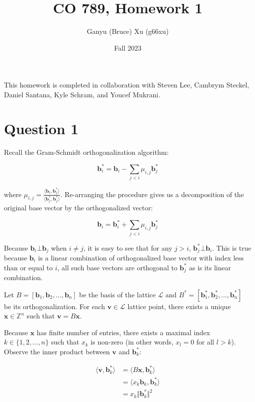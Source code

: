 \documentclass{article}
\title{CO 789, Homework 1}
\author{Ganyu (Bruce) Xu (g66xu)}
\date{Fall 2023}
\newcommand{\norm}[1]{\Vert {#1} \Vert}
\begin{document}

This homework is completed in collaboration with Steven Lee, Cambrym Steckel, Daniel Santana, Kyle Schram, and Youcef Mukrani.

\section*{Question 1}
Recall the Gram-Schmidt orthogonalization algorithm:

$$
\mathbf{b}_i^\ast = \mathbf{b}_i - \sum_{j<i} \mu_{i,j} \mathbf{b}_j^\ast
$$

where $\mu_{i, j} = \frac{\langle \mathbf{b}_i, \mathbf{b}_j^\ast \rangle}{\langle \mathbf{b}_j^\ast, \mathbf{b}_j^\ast\rangle}$. Re-arranging the procedure gives us a decomposition of the original base vector by the orthogonalized vector:

$$
\mathbf{b}_i = \mathbf{b}_i^\ast + \sum_{j<i}\mu_{i,j}\mathbf{b}_j^\ast
$$

Because $\mathbf{b}_i \bot \mathbf{b}_j$ when $i \neq j$, it is easy to see that for any $j > i$, $\mathbf{b}_j^\ast \bot \mathbf{b}_i$. This is true because $\mathbf{b}_i$ is a linear combination of orthogonalized base vector with index less than or equal to $i$, all such base vectors are orthogonal to $\mathbf{b}_j^\ast$ as is its linear combination.

Let $B = [\mathbf{b}_1, \mathbf{b}_2, \ldots, \mathbf{b}_n]$ be the basis of the lattice $\mathcal{L}$ and $B^\ast = [\mathbf{b}_1^\ast, \mathbf{b}_2^\ast, \ldots, \mathbf{b}_n^\ast]$ be its orthogonalization. For each $\mathbf{v} \in \mathcal{L}$ lattice point, there exists a unique $\mathbf{x} \in \mathbb{Z}^n$ such that $\mathbf{v} = B\mathbf{x}$.

Because $\mathbf{x}$ has finite number of entries, there exists a maximal index $k \in \{1, 2, \ldots, n\}$ such that $x_k$ is non-zero (in other words, $x_l = 0$ for all $l > k$). Observe the inner product between $\mathbf{v}$ and $\mathbf{b}_k^\ast$:

$$
\begin{aligned}
\langle \mathbf{v}, \mathbf{b}_k^\ast \rangle
&= \langle B\mathbf{x}, \mathbf{b}_k^\ast\rangle \\
&= \langle x_k\mathbf{b}_k, \mathbf{b}_k^\ast \rangle \\
&= x_k \norm{\mathbf{b}_k^\ast}^2
\end{aligned}
$$
\end{document}
